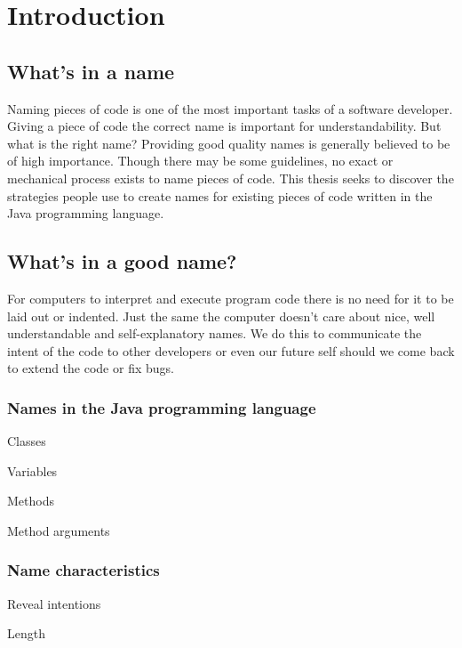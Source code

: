 \section{Introduction}

\subsection{What's in a name}

Naming pieces of code is one of the most important tasks of a software developer. Giving a piece of code the correct name is important for understandability. But what is the right name? Providing good quality names is generally believed to be of high importance. Though there may be some guidelines, no exact or mechanical process exists to name pieces of code. This thesis seeks to discover the strategies people use to create names for existing pieces of code written in the Java programming language.

\subsection{What's in a good name?}

For computers to interpret and execute program code there is no need for it to be laid out or indented. Just the same the computer doesn't care about nice, well understandable and self-explanatory names. We do this to communicate the intent of the code to other developers or even our future self should we come back to extend the code or fix bugs.

\subsubsection{Names in the Java programming language}

\begin{list}{-}{Names in the Java programming language:}
\item Classes
\item Variables
\item Methods
\item Method arguments
\end{list}

\subsubsection{Name characteristics}

\begin{list}{-}{Characteristics of names in programming.e:}
\item Reveal intentions
\item Length
\end{list}


